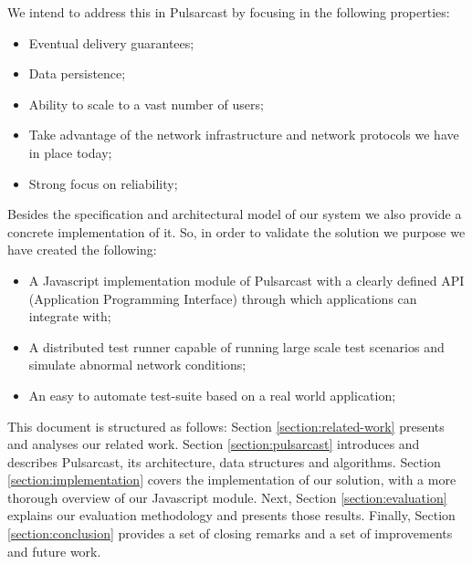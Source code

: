 We intend to address this in Pulsarcast by focusing in the following
properties:

\begin{itemize}
  \item
    Eventual delivery guarantees;
  \item
    Data persistence;
  \item
    Ability to scale to a vast number of users;
  \item
    Take advantage of the network infrastructure and network protocols we have in place today;
  \item
    Strong focus on reliability;
\end{itemize}

Besides the specification and architectural model of our system we also provide
a concrete implementation of it. So, in order to validate the solution we
purpose we have created the following:

\begin{itemize}
  \item
    A Javascript implementation module of Pulsarcast with a clearly defined API (Application Programming Interface) through which applications can integrate with;
  \item
    A distributed test runner capable of running large scale test scenarios and simulate abnormal network conditions;
  \item
    An easy to automate test-suite based on a real world application;
\end{itemize}

This document is structured as follows: Section \ref{section:related-work}
presents and analyses our related work. Section \ref{section:pulsarcast}
introduces and describes Pulsarcast, its architecture, data structures and
algorithms. Section \ref{section:implementation} covers the implementation of
our solution, with a more thorough overview of our Javascript module. Next,
Section \ref{section:evaluation} explains our evaluation methodology and
presents those results. Finally, Section \ref{section:conclusion} provides a
set of closing remarks and a set of improvements and future work.
